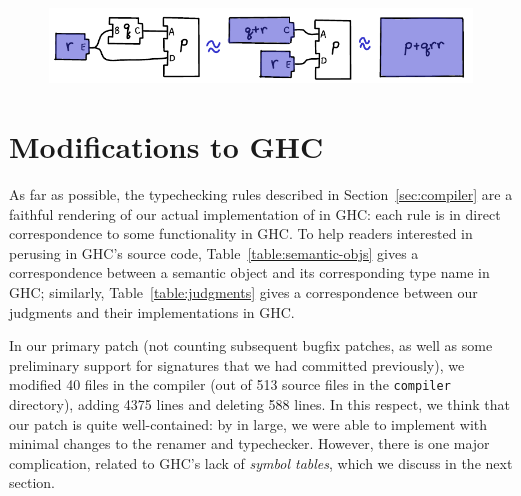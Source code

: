 \begin{figure}[H]
\center\includegraphics{figures/unit-identifier-improvement.pdf}
\end{figure}

\section{Modifications to GHC}

As far as possible, the typechecking rules described in
Section~\ref{sec:compiler} are a faithful rendering of our
actual implementation of \Backpack{} in GHC\@: each rule
is in direct correspondence to some functionality in
GHC\@.  To help readers interested in perusing \Backpack{} in GHC's
source code, Table~\ref{table:semantic-objs} gives a correspondence
between a semantic object and its corresponding type name in GHC\@;
similarly, Table~\ref{table:judgments} gives a correspondence between
our judgments and their implementations in GHC\@.

In our primary \Backpack{} patch (not counting subsequent bugfix
patches, as well as some preliminary support for signatures that we had
committed previously), we modified 40 files in the compiler (out of 513
source files in the \verb|compiler| directory), adding 4375 lines and
deleting 588 lines.  In this respect, we think that our \Backpack{}
patch is quite well-contained: by in large, we were able to implement
\Backpack{} with minimal changes to the renamer and typechecker.
However, there is one major complication, related to GHC's lack
of \emph{symbol tables}, which we discuss in the next section.

